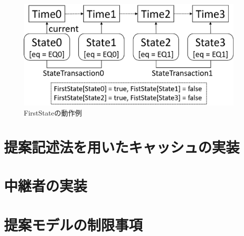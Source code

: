 \documentclass[12pt,a4paper]{jbook}
\begin{document}
\begin{figure}[htb]
\centering
\includegraphics[width=400pt]{./fig/FirstState.eps}
\caption{FirstStateの動作例}
\label{fig:FirstState}
\end{figure}

\section{提案記述法を用いたキャッシュの実装}
\section{中継者の実装}
\section{提案モデルの制限事項}
\end{document}

